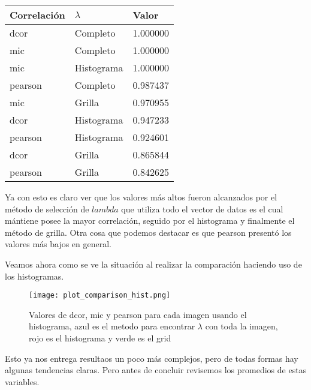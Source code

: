     \begin{table}[H]
        \centering
        \begin{tabular}{|l|l|l|}
            \hline
        Correlaci\'on    & $\lambda$ & Valor  \\    \hline
        dcor    & Completo & 1.000000  \\
        mic     & Completo & 1.000000  \\
        mic     & Histograma & 1.000000  \\
        pearson & Completo & 0.987437  \\
        mic     & Grilla & 0.970955  \\
        dcor    & Histograma & 0.947233  \\
        pearson & Histograma & 0.924601  \\
        dcor    & Grilla & 0.865844  \\
        pearson & Grilla & 0.842625  \\     \hline

        \end{tabular}
    \end{table}

    Ya con esto es claro ver que los valores m\'as altos fueron alcanzados por el m\'etodo de selecci\'on de $lambda$ que utiliza todo el vector de datos es el cual m\'antiene posee la mayor correlaci\'on, seguido por el histograma y finalmente el m\'etodo de grilla. Otra cosa que podemos destacar es que pearson present\'o los valores m\'as bajos en general.

    Veamos ahora como se ve la situaci\'on al realizar la comparaci\'on haciendo uso de los histogramas.

    \begin{figure}[H]
        \centering
        \texttt{[image: plot\_comparison\_hist.png]}
        \caption{Valores de dcor, mic y pearson para cada imagen usando el histograma, azul es el metodo para encontrar $\lambda$ con toda la imagen, rojo es el histograma y verde es el grid}
    \end{figure}

    Esto ya nos entrega resultaos un poco m\'as complejos, pero de todas formas hay algunas tendencias claras. Pero antes de concluir revisemos los promedios de estas variables.

